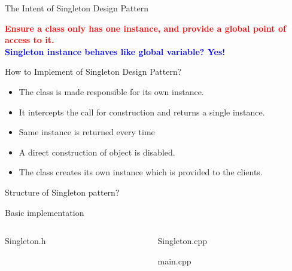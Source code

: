 \documentclass[13pt]{beamer}
\begin{document}
\begin{frame}{The Intent of Singleton Design Pattern}
	\begin{center}
	\textcolor{red}{\textbf{Ensure a class only has one instance, and provide a global point of 		access to it.}}\\
	\textcolor{blue}{\textbf{Singleton instance behaves like global variable? Yes!}}
	\end{center}
\end{frame}

\begin{frame}{How to Implement of Singleton Design Pattern?}
	\begin{itemize}
		\setlength\itemsep{2em}
		\item The class is made responsible for its own instance.
		\item It intercepts the call for construction and returns a single instance.
		\item Same instance is returned every time
		\item A direct construction of object is disabled.
		\item The class creates its own instance which is provided to the clients.
	\end{itemize}
\end{frame}

\begin{frame}{Structure of Singleton pattern?}
	\begin{center}
	\end{center}
\end{frame}

\begin{frame}{Basic implementation}
\begin{columns}[T]
\begin{column}{.48\textwidth}
\lstset{basicstyle=\tiny,style=myCustomCppStyle}
Singleton.h

\end{column}

\begin{column}{.48\textwidth}
\lstset{basicstyle=\tiny,style=myCustomCppStyle}
Singleton.cpp

main.cpp

\end{column}
\end{columns}
\end{frame}
\end{document}
